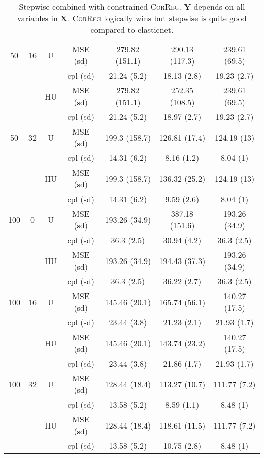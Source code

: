 \documentclass[11pt,a4paper]{article}
\begin{document}
\begin{table}[h!]
\begin{tabular}{|c|c|c|c|c|c|c|}
\hline %
50 & 16 & U&	MSE (sd) & 279.82 (151.1) & 290.13 (117.3) & 239.61 (69.5) \\
& & & cpl (sd) & 21.24 (5.2) & 18.13 (2.8) & 19.23 (2.7) \\
 &  &HU &MSE (sd) & 279.82 (151.1) & 252.35 (108.5) & 239.61 (69.5) \\
& & & cpl (sd) & 21.24 (5.2) & 18.97 (2.7) & 19.23 (2.7) \\
\hline %
50 & 32 & U&MSE (sd) & 199.3 (158.7) & 126.81 (17.4) & 124.19 (13) \\
& & & cpl (sd) & 14.31 (6.2) & 8.16 (1.2) & 8.04 (1) \\
 &  &HU &MSE (sd) & 199.3 (158.7) & 136.32 (25.2) & 124.19 (13) \\
& & &cpl (sd) & 14.31 (6.2) & 9.59 (2.6) & 8.04 (1) \\
\hline
\hline %
100 & 0 & U&   MSE (sd) & 193.26 (34.9) & 387.18 (151.6) & 193.26 (34.9) \\
& & & cpl (sd) & 36.3 (2.5) & 30.94 (4.2) & 36.3 (2.5) \\
 &  &HU &   MSE (sd) & 193.26 (34.9) & 194.43 (37.3) & 193.26 (34.9) \\
& & &  cpl (sd) & 36.3 (2.5) & 36.22 (2.7) & 36.3 (2.5) \\
\hline %
100 & 16 & U&  MSE (sd) & 145.46 (20.1) & 165.74 (56.1) & 140.27 (17.5) \\
& & & cpl (sd) & 23.44 (3.8) & 21.23 (2.1) & 21.93 (1.7) \\
 &  &HU &  MSE (sd) & 145.46 (20.1) & 143.74 (23.2) & 140.27 (17.5) \\
& & & cpl (sd) & 23.44 (3.8) & 21.86 (1.7) & 21.93 (1.7) \\
\hline %
100 & 32 & U& MSE (sd) & 128.44 (18.4) & 113.27 (10.7) & 111.77 (7.2) \\
& & &  cpl (sd) & 13.58 (5.2) & 8.59 (1.1) & 8.48 (1) \\
 &  &HU &  MSE (sd) & 128.44 (18.4) & 118.61 (11.5) & 111.77 (7.2) \\
& & & cpl (sd) & 13.58 (5.2) & 10.75 (2.8) & 8.48 (1) \\
\hline
\end{tabular} 
\caption{Stepwise  combined with constrained \textsc{CorReg}. $\boldsymbol{Y}$ depends on all variables in $\boldsymbol{X}$. \textsc{CorReg} logically wins but stepwise is quite good compared to elasticnet.}\label{YXlinstep}
\end{table}
\end{document}
